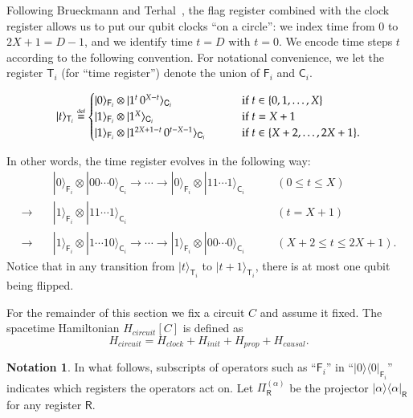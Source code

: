 \documentclass[11pt,letterpaper]{article}
\theoremstyle{definition}
\newtheorem{notation}[theorem]{Notation}
\theoremstyle{remark}
\newcommand{\defeq}{\stackrel{\mbox{\normalfont\tiny def}}=}
\renewcommand{\leq}{\leqslant}
\numberwithin{equation}{section}
\theoremstyle{definition}
\newcommand{\ket}[1]{|#1\rangle}
\newcommand{\ketbra}[2]{|#1\rangle\! \langle #2|}
\newcommand{\sC}{{\mathsf{C}}}
\newcommand{\sF}{{\mathsf{F}}}
\newcommand{\sR}{{\mathsf{R}}}
\newcommand{\sT}{{\mathsf{T}}}
\begin{document}
%

Following Brueckmann and Terhal~\cite{breuckmann2014space}, the flag register combined with the clock register allows us to put our qubit clocks ``on a circle'': %
we index time from $0$ to $2X+1 = D-1$, and we identify time $t = D$ with $t = 0$. %
%
%
%
%
We encode time steps $t$ according to the following convention. For notational convenience, we let the register $\sT_i$ (for ``time register'') denote the union of $\sF_i$ and $\sC_i$. 

\begin{equation}
\label{eq:time_register}
  \ket{t}_{\sT_i} \defeq \begin{cases}
  \ket{0}_{\sF_i} \otimes \ket{1^t \, 0^{X - t}}_{\sC_i} & \qquad \text{ if } t \in \{0,1,\ldots,X\} \\
  \ket{1}_{\sF_i} \otimes \ket{1^X}_{\sC_i} & \qquad \text{ if } t = X+1 \\
  \ket{1}_{\sF_i} \otimes \ket{1^{2X+1-t}\, 0^{t - X-1}}_{\sC_i} & \qquad \text{ if } t \in \{X+2,\ldots,2X+1 \}. 
  \end{cases}
\end{equation}
%
%
%
%
%
%
%
%
%
%
%
%
%

In other words, the time register evolves in the following way:
\begin{align}
  &\ket{0}_{\sF_i} \otimes \ket{00 \cdots 0}_{\sC_i} \to \cdots \to \ket{0}_{\sF_i} \otimes \ket{11 \cdots 1}_{\sC_i} & \qquad (0 \leq t \leq X) \\
  \to \quad &\ket{1}_{\sF_i} \otimes \ket{11 \cdots 1}_{\sC_i} & \qquad (t = X+1)\\
  \to \quad &\ket{1}_{\sF_i} \otimes \ket{1 \cdots 10}_{\sC_i} \to \cdots \to \ket{1}_{\sF_i} \otimes \ket{00 \cdots 0}_{\sC_i} & \qquad (X+2 \leq t \leq 2X+1).
%
%
%
\end{align}
Notice that in any transition from $\ket{t}_{\sT_i}$ to $\ket{t+1}_{\sT_i}$, there is at most one qubit being flipped. 
%
%
%
%



%

%

For the remainder of this section we fix a circuit $C$ and assume it fixed. The spacetime Hamiltonian $H_{circuit}[C]$ is defined as
\begin{equation}
\label{eq:code_hamiltonian}
  H_{circuit} = H_{clock} + H_{init} + H_{prop} + H_{causal}.
\end{equation}
\begin{notation}
In what follows, subscripts of operators such as ``$\sF_i$'' in ``$\ketbra{0}{0}_{\sF_i}$'' indicates which registers the operators act on. Let $\Pi_{\sR}^{(\alpha)}$ be the projector $\ketbra{\alpha}{\alpha}_\sR$ for any register $\sR$.
\end{notation}
\end{document}
